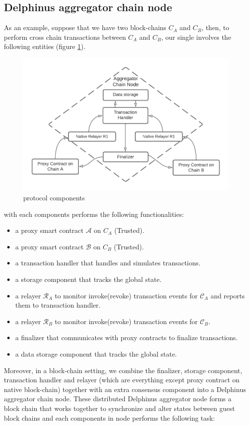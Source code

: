\documentclass[pageno]{jpaper}
\begin{document}
\subsection{Delphinus aggregator chain node}
As an example, suppose that we have two block-chains $C_{A}$ and $C_{B}$, then, to perform cross chain transactions between $C_A$  and $C_B$, our single \dprotocol involves the following entities (figure \ref{protocol-components}). 
\begin{figure}[ht]
\caption{protocol components}
\label{protocol-components}
\includegraphics[scale=0.5]{components}
\end{figure}

with each components performs the following functionalities:
\begin{itemize}
\item  a proxy smart contract $\mathcal{A}$ on $C_{A}$ (Trusted).
\item  a proxy smart contract $\mathcal{B}$ on $C_{B}$ (Trusted).
\item  a transaction handler that handles and simulates transactions.
\item  a storage component that tracks the global state.
\item  a relayer $\mathcal{R}_A$ to monitor invoke(revoke) transaction events for $\mathcal{C}_A$ and reports them to transaction handler.
\item  a relayer $\mathcal{R}_B$ to monitor invoke(revoke) transaction events for $\mathcal{C}_B$.
\item  a finalizer that communicates with proxy contracts to finalize transactions.
\item  a data storage component that tracks the global state.
\end{itemize}
Moreover, in a block-chain setting, we combine the finalizer, storage component, transaction handler and relayer (which are everything except proxy contract on native block-chain) together with an extra consensus component into a Delphinus aggregator chain node. These distributed Delphinus aggregator node forms a block chain that works together to synchronize and alter states between guest block chains and each components in node performs the following task:
\end{document}
